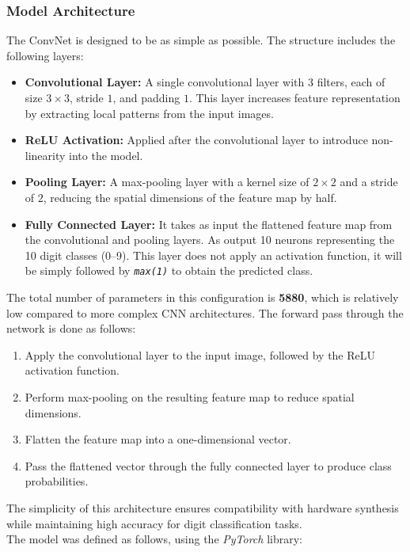 \documentclass{article}
\begin{document}
\subsubsection{Model Architecture}
The ConvNet is designed to be as simple as possible. The structure includes the following layers:
\begin{itemize}
    \item \textbf{Convolutional Layer:} A single convolutional layer with 3 filters, each of size $3 \times 3$, stride $1$, and padding $1$. This layer increases feature representation by extracting local patterns from the input images.
    \item \textbf{ReLU Activation:} Applied after the convolutional layer to introduce non-linearity into the model.
    \item \textbf{Pooling Layer:} A max-pooling layer with a kernel size of $2 \times 2$ and a stride of $2$, reducing the spatial dimensions of the feature map by half.
    \item \textbf{Fully Connected Layer:} It takes as input the flattened feature map from the convolutional and pooling layers. As output 10 neurons representing the 10 digit classes (0–9). This layer does not apply an activation function, it will be simply followed by \texttt{\textit{max(1)}} to obtain the predicted class.
\end{itemize}

The total number of parameters in this configuration is \textbf{5880}, which is relatively low compared to more complex CNN architectures. The forward pass through the network is done as follows:
\begin{enumerate}
    \item Apply the convolutional layer to the input image, followed by the ReLU activation function.
    \item Perform max-pooling on the resulting feature map to reduce spatial dimensions.
    \item Flatten the feature map into a one-dimensional vector.
    \item Pass the flattened vector through the fully connected layer to produce class probabilities.
\end{enumerate}

The simplicity of this architecture ensures compatibility with hardware synthesis while maintaining high accuracy for digit classification tasks.\\

The model was defined as follows, using the \textit{PyTorch} library:
\end{document}
